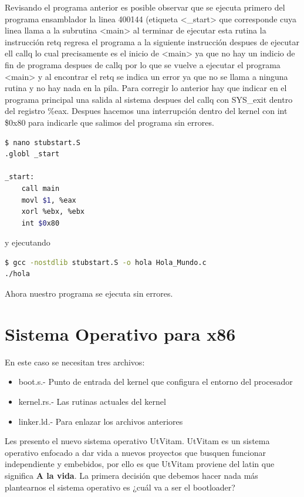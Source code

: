 \documentclass[12pt, twoside]{report}
\begin{document}
Revisando el programa anterior es posible observar que se ejecuta primero del programa ensamblador la linea 400144 (etiqueta <\_start> que corresponde cuya linea llama a la subrutina <main> al terminar de ejecutar esta rutina la instrucción retq regresa el programa a la siguiente instrucción despues de ejecutar ell callq lo cual precisamente es el inicio de <main> ya que no hay un indicio de fin de programa despues de callq por lo que se vuelve a ejecutar el programa <main> y al encontrar el retq se indica un error ya que no se llama a ninguna rutina y no hay nada en la pila. Para corregir lo anterior hay que indicar en el programa principal una salida  al sistema despues del callq con SYS\_exit dentro del registro \%eax. Despues hacemos una interrupción dentro del kernel con int \$0x80 para indicarle que salimos del programa sin errores.

\begin{lstlisting}[language=bash]
$ nano stubstart.S
.globl _start

_start:
    call main
    movl $1, %eax
    xorl %ebx, %ebx
    int $0x80
\end{lstlisting}

y ejecutando
\begin{lstlisting}[language=bash]
$ gcc -nostdlib stubstart.S -o hola Hola_Mundo.c
./hola
\end{lstlisting}

Ahora nuestro programa se ejecuta sin errores.
\chapter{Sistema Operativo para x86}

En este caso se necesitan tres archivos:
\begin{itemize}
\item boot.s.- Punto de entrada del kernel que configura el entorno del procesador
\item kernel.rs.- Las rutinas actuales del kernel
\item linker.ld.- Para enlazar los archivos anteriores 
\end{itemize}


Les presento el nuevo sistema operativo UtVitam. UtVitam es un sistema operativo enfocado a dar vida a nuevos proyectos que busquen funcionar independiente y embebidos, por ello es que UtVitam proviene del latin que significa \textbf{A la vida}. La primera decisión que debemos hacer nada más plantearnos el sistema operativo es ¿cuál va a ser el bootloader?
\end{document}
